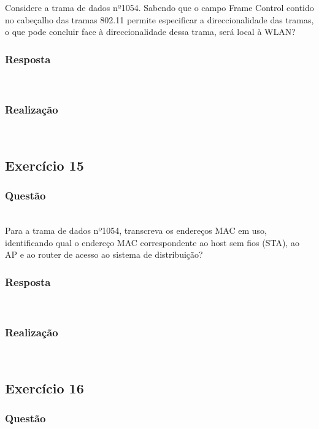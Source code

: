 \documentclass{llncs}
\begin{document}
Considere a trama de dados nº1054. Sabendo que o campo Frame Control contido no cabeçalho das tramas 802.11 permite especificar a direccionalidade das tramas, o que pode concluir face à direccionalidade dessa trama, será local à WLAN?

\subsubsection{Resposta}\rule[-10pt]{0pt}{10pt}\\


\subsubsection{Realização}\rule[-10pt]{0pt}{10pt}\\


\clearpage
\subsection{Exercício 15}
\subsubsection{Questão}\rule[-10pt]{0pt}{10pt}\\

Para a trama de dados nº1054, transcreva os endereços MAC em uso, identificando qual o endereço MAC correspondente ao host sem fios (STA), ao AP e ao router de acesso ao sistema de distribuição?

\subsubsection{Resposta}\rule[-10pt]{0pt}{10pt}\\



\subsubsection{Realização}\rule[-10pt]{0pt}{10pt}\\



\clearpage
\subsection{Exercício 16}
\subsubsection{Questão}\rule[-10pt]{0pt}{10pt}\\
\end{document}
